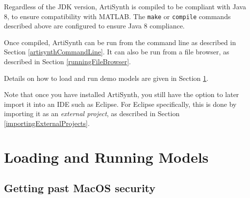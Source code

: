 \begin{sideblock}
Regardless of the JDK version, ArtiSynth is compiled to be compliant with Java
8, to ensure compatibility with MATLAB.  The {\tt make} or {\tt compile}
commands described above are configured to ensure Java 8 compliance.
\end{sideblock}

Once compiled, ArtiSynth can be run from the command line as described
in Section \ref{artisynthCommandLine}.
\ifMacOS
It can also be run from a file browser, as described
in Section \ref{runningFileBrowser}.
\fi
%
\fi %

Details on how to load and run demo models are given in
Section \ref{Running}.

Note that once you have installed ArtiSynth, you still have the option
to later import it into an IDE such as Eclipse. For Eclipse
specifically, this is done by importing it as an {\it external
project}, as described in Section \ref{importingExternalProjects}.

\section{Loading and Running Models}
\label{Running}

\ifMacOS
\subsection{Getting past MacOS security}

